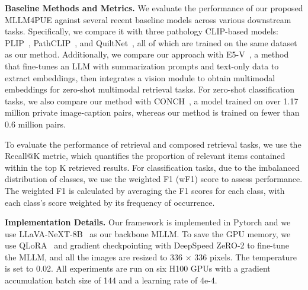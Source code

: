\noindent
\textbf{Baseline Methods and Metrics.}
We evaluate the performance of our proposed MLLM4PUE against several recent baseline models across various downstream tasks. Specifically, we compare it with three pathology CLIP-based models: PLIP~\cite{huang2023visual}, PathCLIP~\cite{sun2024pathasst}, and QuiltNet~\cite{ikezogwo2024quilt}, all of which are trained on the same dataset as our method. Additionally, we compare our approach with E5-V~\cite{jiang2024e5}, a method that fine-tunes an LLM with summarization prompts and text-only data to extract embeddings, then integrates a vision module to obtain multimodal embeddings for zero-shot multimodal retrieval tasks. For zero-shot classification tasks, we also compare our method with CONCH~\cite{lu2024visual}, a model trained on over 1.17 million private image-caption pairs, whereas our method is trained on fewer than 0.6 million pairs.

To evaluate the performance of retrieval and composed retrieval tasks, we use the Recall@K metric, which quantifies the proportion of relevant items contained within the top K retrieved results. For classification tasks, due to the imbalanced distribution of classes, we use the weighted F1 (wF1) score to assess performance. The weighted F1 is calculated by averaging the F1 scores for each class, with each class's score weighted by its frequency of occurrence.

\noindent
\textbf{Implementation Details.} Our framework is implemented in Pytorch and we use LLaVA-NeXT-8B~\cite{li2024llava} as our backbone MLLM. To save the GPU memory, we use QLoRA~\cite{dettmers2024qlora} and gradient checkpointing with DeepSpeed ZeRO-2 to fine-tune the MLLM, and all the images are resized to 336 × 336 pixels. The temperature is set to 0.02. All experiments are run on six H100 GPUs with a gradient accumulation batch size of 144 and a learning rate of 4e-4.

